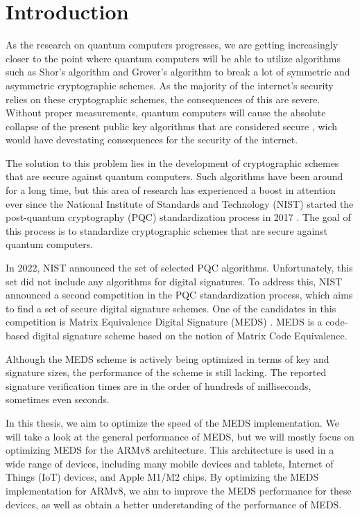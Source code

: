 \documentclass[11pt,a4paper]{report}
\theoremstyle{definition}
\begin{document}




\tableofcontents
\newpage

\chapter{Introduction}
\label{ch:introduction}
As the research on quantum computers progresses, we are getting increasingly closer to the point where quantum computers will be able to utilize algorithms such as Shor's algorithm \cite{shor1994algorithms} and Grover's algorithm \cite{grover1996fast} to break a lot of symmetric and asymmetric cryptographic schemes. As the majority of the internet's security relies on these cryptographic schemes, the consequences of this are severe. Without proper measurements, quantum computers will cause the absolute collapse of the present public key algorithms that are considered secure \cite{mavroeidis2018impact}, wich would have devestating consequences for the security of the internet.

The solution to this problem lies in the development of cryptographic schemes that are secure against quantum computers. Such algorithms have been around for a long time, but this area of research has experienced a boost in attention ever since the National Institute of Standards and Technology (NIST) started the post-quantum cryptography (PQC) standardization process in 2017 \cite{nist2017pqc}. The goal of this process is to standardize cryptographic schemes that are secure against quantum computers.

In 2022, NIST announced the set of selected PQC algorithms. Unfortunately, this set did not include any algorithms for digital signatures. To address this, NIST announced a second competition in the PQC standardization process, which aims to find a set of secure digital signature schemes. One of the candidates in this competition is Matrix Equivalence Digital Signature (MEDS) \cite{chou2023take}. MEDS is a code-based digital signature scheme based on the notion of Matrix Code Equivalence.

Although the MEDS scheme is actively being optimized in terms of key and signature sizes, the performance of the scheme is still lacking. The reported signature verification times are in the order of hundreds of milliseconds, sometimes even seconds.

In this thesis, we aim to optimize the speed of the MEDS implementation. We will take a look at the general performance of MEDS, but we will mostly focus on optimizing MEDS for the ARMv8 architecture. This architecture is used in a wide range of devices, including many mobile devices and tablets, Internet of Things (IoT) devices, and Apple M1/M2 chips. By optimizing the MEDS implementation for ARMv8, we aim to improve the MEDS performance for these devices, as well as obtain a better understanding of the performance of MEDS.
\end{document}
